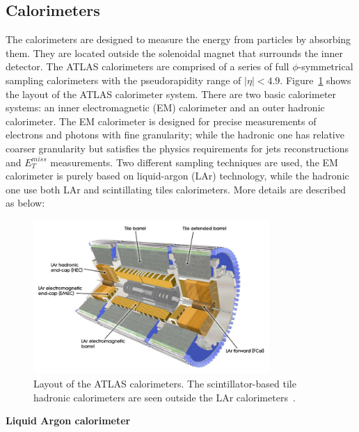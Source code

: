 \subsection{Calorimeters}

The calorimeters are designed to measure the energy from particles by absorbing them.
They are located outside the solenoidal magnet that surrounds the inner detector.
The ATLAS calorimeters are comprised of a series of full $\phi$-symmetrical sampling calorimeters with the pseudorapidity range of $|\eta|<4.9$.
Figure~\ref{fig:calo_dec} shows the layout of the ATLAS calorimeter system.
There are two basic calorimeter systems: an inner electromagnetic (EM) calorimeter and an outer hadronic calorimeter.
The EM calorimeter is designed for precise measurements of electrons and photons with fine granularity;
while the hadronic one has relative coarser granularity but satisfies the physics requirements for jets reconstructions and $E_{T}^{miss}$ measurements.
Two different sampling techniques are used, the EM calorimeter is purely based on liquid-argon (LAr) technology, while the hadronic one use both LAr and scintillating tiles calorimeters. 
More details are described as below:
\begin{figure}[!htb]
  \centering
  \includegraphics[width=0.8\textwidth]{figures/Detector/calo_layout.png}
  \caption{Layout of the ATLAS calorimeters. The scintillator-based tile hadronic calorimeters are seen outside the LAr calorimeters~\cite{Buchanan:2008}.}
  \label{fig:calo_dec}
\end{figure}

\textbf{Liquid Argon calorimeter}

